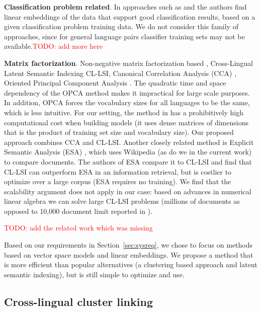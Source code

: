 \documentclass[twoside,11pt]{article}
\newcommand{\todo}[1]{\textcolor{red}{TODO: #1}}
\begin{document}
\textbf{Classification problem related}. In approaches such as \cite{cotrain} and  the authors find linear embeddings of the data that support good classification results, based on a given classification problem training data. We do not consider this family of approaches, since for general language pairs classifier training sets may not be available.\todo{add more here}

\textbf{Matrix factorization}. Non-negative matrix factorization based \cite{nonnegfactor_lsi}, Cross-Lingual Latent Semantic Indexing CL-LSI\cite{multilingualBook}, Canonical Correlation Analysis (CCA) \cite{Hotelling}, Oriented Principal Component Analysis \cite{platt2010translingual}. The quadratic time and space dependency of the OPCA method makes it impractical for large scale purposes. In addition, OPCA forces the vocabulary sizes for all languages to be the same, which is less intuitive. For our setting, the method in \cite{nonnegfactor_lsi} has a prohibitively high computational cost when building models (it uses dense matrices of dimensions that is the product of training set size and vocabulary size). Our proposed approach combines CCA and CL-LSI. Another closely related method is Explicit Semantic Analysis (ESA) \cite{ESA}, which uses Wikipedia (as do we in the current work) to compare documents. The authors of ESA compare it to CL-LSI and find that CL-LSI can outperform ESA in an information retrieval, but is costlier to optimize over a large corpus (ESA requires no training). We find that the scalability argument does not apply in our case: based on advances in numerical linear algebra we can solve large CL-LSI problems (millions of documents as opposed to 10,000 document limit reported in \cite{ESA}).

\todo{add the related work which was missing}

Based on our requirements in Section~\ref{sec:sysreq}, we chose to focus on methods based on vector space models and linear embeddings. We propose a method that is more efficient than popular alternatives (a clustering based approach and latent semantic indexing), but is still simple to optimize and use.

\subsection{Cross-lingual cluster linking}
\end{document}
